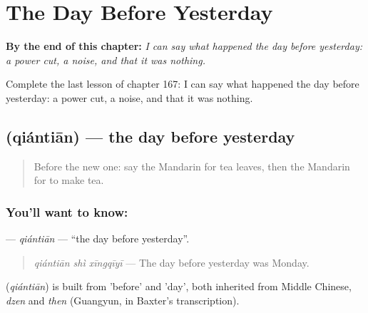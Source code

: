 
\chapter{The Day Before Yesterday}
\label{ch:zh-the-day-before-yesterday}

\begin{chapteropening}
\textbf{By the end of this chapter:} \emph{I can say what happened the day before yesterday: a power cut, a noise, and that it was nothing.}

Complete the last lesson of chapter 167: I can say what happened the day before yesterday: a power cut, a noise, and that it was nothing.
\end{chapteropening}

\section[\texorpdfstring{\zh{前天} (qiántiān)}{前天 (qiántiān)}]{ (qiántiān) — the day before yesterday}

\label{lesson:ZH-C167-qiantian}



\begin{quote}
Before the new one: say the Mandarin for tea leaves, then the Mandarin for to make tea.
\end{quote}

\subsection*{You'll want to know: }
\textbf{} — \emph{qiántiān} — \textquotedblleft{}the day before yesterday\textquotedblright{}.

\begin{quote}
\textbf{} \emph{qiántiān shì xīngqīyī} — The day before yesterday was Monday.
\end{quote}

\begin{cousinweb}
\textbf{} (\emph{qiántiān}) is built from  'before' and  'day', both inherited from Middle Chinese, \emph{dzen} and \emph{then} (Guangyun, in Baxter's transcription).
\end{cousinweb}

